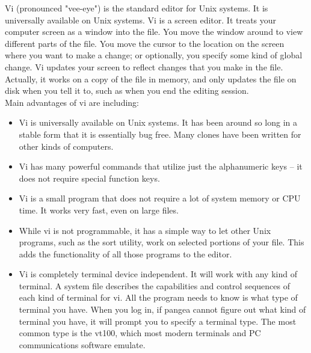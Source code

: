 \begin{information}
Vi (pronounced "vee-eye") is the standard editor for Unix systems. It is universally available on
Unix systems. Vi is a screen editor. It treats your computer screen as a window into the file. You
move the window around to view different parts of the file. You move the cursor to the location on
the screen where you want to make a change; or optionally, you specify some kind of global change.
Vi updates your screen to reflect changes that you make in the file. Actually, it works on a copy of
the file in memory, and only updates the file on disk when you tell it to, such as when you end the
editing session. \\
Main advantages of vi are including: 
\begin{itemize}
  \item Vi is universally available on Unix systems. It has been around so long in a stable form
that it is essentially bug free. Many clones have been written for other kinds of computers.
  \item Vi has many powerful commands that utilize just the alphanumeric keys -- it does not require
special function keys.
  \item Vi is a small program that does not require a lot of system memory or CPU time. It works
very fast, even on large files.
  \item While vi is not programmable, it has a simple way to let other Unix programs, such as the
sort utility, work on selected portions of your file. This adds the functionality of all those
programs to the editor.
  \item Vi is completely terminal device independent. It will work with any kind of terminal.
A system file describes the capabilities and control sequences of each kind of terminal for vi. All
the program needs to know is what type of terminal you have. When you log in, if pangea cannot
figure out what kind of terminal you have, it will prompt you to specify a terminal type. The most
common type is the vt100, which most modern terminals and PC communications software emulate.
\end{itemize}
\end{information} 
